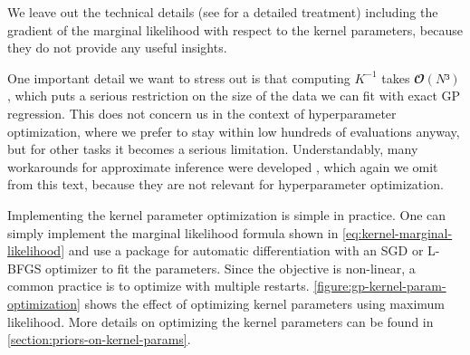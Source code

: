 We leave out the technical details (see \cite{williams2006gaussian} for
a detailed treatment) including the gradient of the marginal likelihood with respect to the
kernel parameters, because they do not provide any useful insights.

One important detail we want to stress out is that computing $K^{-1}$ takes
$𝓞(N³)$, which puts a serious restriction on the size of the data we can fit
with exact GP regression. This does not concern us in the context of
hyperparameter optimization, where we prefer to stay within low hundreds of
evaluations anyway, but for other tasks it becomes a serious limitation.
Understandably, many workarounds for approximate inference were developed
\citep{williams2006gaussian}, which again we omit from this text, because they
are not relevant for hyperparameter optimization.

Implementing the kernel parameter optimization is simple in practice. One can
simply implement the marginal likelihood formula shown in
\autoref{eq:kernel-marginal-likelihood} and
use a package for automatic differentiation with an SGD or L-BFGS optimizer
to fit the parameters. Since the objective is non-linear, a common
practice \citep{gpy2014} is to optimize with multiple restarts.
\autoref{figure:gp-kernel-param-optimization} shows the effect of optimizing
kernel parameters using maximum likelihood. More details on optimizing the kernel
parameters can be found in \autoref{section:priors-on-kernel-params}.
